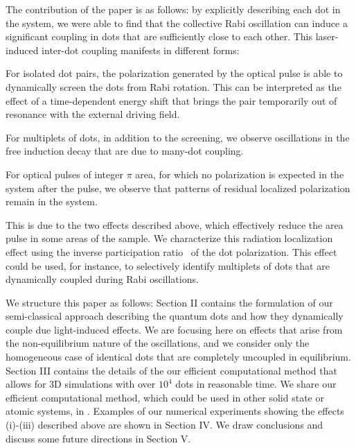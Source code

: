 The contribution of the paper is as follows: by explicitly describing each dot in the system, we were able to find that the collective Rabi oscillation can induce a significant coupling in dots that are sufficiently close to each other.
This laser-induced inter-dot coupling manifests in different forms:
\begin{inparaenum}[(i)]
  \item For isolated dot pairs, the polarization generated by the optical pulse is able to dynamically screen the dots from Rabi rotation.
  This can be interpreted as the effect of a time-dependent energy shift that brings the pair temporarily out of resonance with the external driving field.
  \item For multiplets of dots, in addition to the screening, we observe oscillations in the free induction decay that are due to many-dot coupling.
  \item For optical pulses of integer $\pi$ area, for which no polarization is expected in the system after the pulse, we observe that patterns of residual localized polarization remain in the system.
\end{inparaenum}
This is due to the two effects described above, which effectively reduce the area pulse in some areas of the sample.
 We characterize this radiation localization effect using the inverse participation ratio~\cite{Schwartz2007} of the dot polarization.
 This effect could be used, for instance, to selectively identify multiplets of dots that are dynamically coupled during Rabi oscillations. 

We structure this paper as follows: Section II contains the formulation of our semi-classical approach describing the quantum dots and how they dynamically couple due light-induced effects.
We are focusing here on effects that arise from the non-equilibrium nature of the oscillations, and we consider only the homogeneous case of identical dots that are completely uncoupled in equilibrium.
Section III contains the details of the our efficient computational method that allows for 3D simulations with over $10^4$ dots in reasonable time.
We share our efficient computational method, which could be used in other solid state or atomic systems, in \cite{githubpage}.
Examples of our numerical experiments showing the effects (i)-(iii) described above are shown in Section IV.
We draw conclusions and discuss some future directions in Section V.
